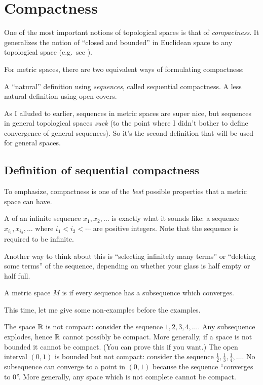 \chapter{Compactness}
One of the most important notions of topological spaces is that of \emph{compactness}.
It generalizes the notion of ``closed and bounded'' in Euclidean space
to any topological space
(e.g.\ see ).

For metric spaces, there are two equivalent ways of formulating compactness:
\begin{itemize}
	\ii A ``natural'' definition using \emph{sequences}, called sequential compactness.
	\ii A less natural definition using open covers.
\end{itemize}
As I alluded to earlier, sequences in metric spaces are super nice,
but sequences in general topological spaces \emph{suck} (to the point where
I didn't bother to define convergence of general sequences).
So it's the second definition that will be used for general spaces.

\section{Definition of sequential compactness}
To emphasize, compactness is one of the
\emph{best} possible properties that a metric space can have.
\begin{definition}
	A  of an infinite sequence
	$x_1, x_2, \dots$ is exactly what it sounds like:
	a sequence $x_{i_1}, x_{i_2}, \dots$
	where $i_1 < i_2 < \cdots$ are positive integers.
	Note that the sequence is required to be infinite.
\end{definition}
Another way to think about this is ``selecting infinitely many terms''
or ``deleting some terms'' of the sequence, depending on whether
your glass is half empty or half full.

\begin{definition}
	A metric space $M$ is  if
	every sequence has a subsequence which converges.
\end{definition}
This time, let me give some non-examples before the examples.
\begin{example}
	\listhack
	\begin{enumerate}[(a)]
		\ii The space $\mathbb R$ is not compact: consider the sequence $1,2,3,4,\dots$.
		Any subsequence explodes, hence $\mathbb R$ cannot possibly be compact.
		\ii More generally, if a space is
		not bounded it cannot be compact.
		(You can prove this if you want.)
		\ii The open interval $(0,1)$ is bounded but not compact:
		consider the sequence $\frac12, \frac13, \frac14, \dots$.
		No subsequence can converge to a point in $(0,1)$ because the sequence ``converges to $0$''.
		\ii More generally, any space which is not complete cannot be compact.
	\end{enumerate}
\end{example}

